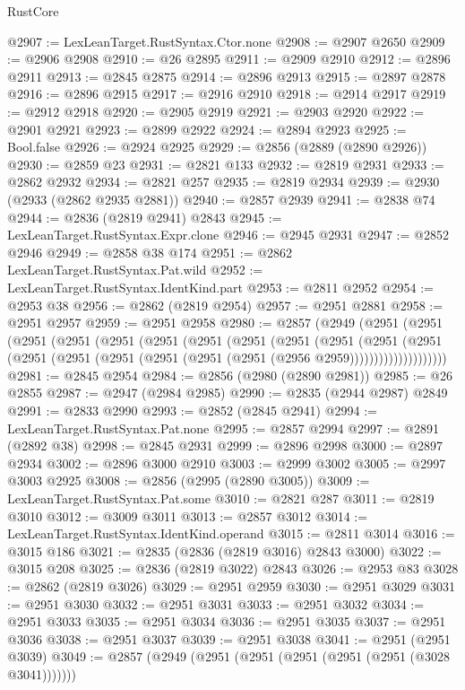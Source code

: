 \begin{lexlean}{RustCore}
\begin{coremodule}
@2907 := LexLeanTarget.RustSyntax.Ctor.none
@2908 := @2907 @2650
@2909 := @2906 @2908
@2910 := @26 @2895
@2911 := @2909 @2910
@2912 := @2896 @2911
@2913 := @2845 @2875
@2914 := @2896 @2913
@2915 := @2897 @2878
@2916 := @2896 @2915
@2917 := @2916 @2910
@2918 := @2914 @2917
@2919 := @2912 @2918
@2920 := @2905 @2919
@2921 := @2903 @2920
@2922 := @2901 @2921
@2923 := @2899 @2922
@2924 := @2894 @2923
@2925 := Bool.false
@2926 := @2924 @2925
@2929 := @2856 (@2889 (@2890 @2926))
@2930 := @2859 @23
@2931 := @2821 @133
@2932 := @2819 @2931
@2933 := @2862 @2932
@2934 := @2821 @257
@2935 := @2819 @2934
@2939 := @2930 (@2933 (@2862 @2935 @2881))
@2940 := @2857 @2939
@2941 := @2838 @74
@2944 := @2836 (@2819 @2941) @2843
@2945 := LexLeanTarget.RustSyntax.Expr.clone
@2946 := @2945 @2931
@2947 := @2852 @2946
@2949 := @2858 @38 @174
@2951 := @2862 LexLeanTarget.RustSyntax.Pat.wild
@2952 := LexLeanTarget.RustSyntax.IdentKind.part
@2953 := @2811 @2952
@2954 := @2953 @38
@2956 := @2862 (@2819 @2954)
@2957 := @2951 @2881
@2958 := @2951 @2957
@2959 := @2951 @2958
@2980 := @2857
    (@2949
      (@2951
        (@2951
          (@2951
            (@2951
              (@2951
                (@2951
                  (@2951
                    (@2951
                      (@2951
                        (@2951
                          (@2951
                            (@2951
                              (@2951
                                (@2951 (@2951 (@2951 (@2951 (@2951 (@2956 @2959))))))))))))))))))))
@2981 := @2845 @2954
@2984 := @2856 (@2980 (@2890 @2981))
@2985 := @26 @2855
@2987 := @2947 (@2984 @2985)
@2990 := @2835 (@2944 @2987) @2849
@2991 := @2833 @2990
@2993 := @2852 (@2845 @2941)
@2994 := LexLeanTarget.RustSyntax.Pat.none
@2995 := @2857 @2994
@2997 := @2891 (@2892 @38)
@2998 := @2845 @2931
@2999 := @2896 @2998
@3000 := @2897 @2934
@3002 := @2896 @3000 @2910
@3003 := @2999 @3002
@3005 := @2997 @3003 @2925
@3008 := @2856 (@2995 (@2890 @3005))
@3009 := LexLeanTarget.RustSyntax.Pat.some
@3010 := @2821 @287
@3011 := @2819 @3010
@3012 := @3009 @3011
@3013 := @2857 @3012
@3014 := LexLeanTarget.RustSyntax.IdentKind.operand
@3015 := @2811 @3014
@3016 := @3015 @186
@3021 := @2835 (@2836 (@2819 @3016) @2843 @3000)
@3022 := @3015 @208
@3025 := @2836 (@2819 @3022) @2843
@3026 := @2953 @83
@3028 := @2862 (@2819 @3026)
@3029 := @2951 @2959
@3030 := @2951 @3029
@3031 := @2951 @3030
@3032 := @2951 @3031
@3033 := @2951 @3032
@3034 := @2951 @3033
@3035 := @2951 @3034
@3036 := @2951 @3035
@3037 := @2951 @3036
@3038 := @2951 @3037
@3039 := @2951 @3038
@3041 := @2951 (@2951 @3039)
@3049 := @2857 (@2949 (@2951 (@2951 (@2951 (@2951 (@2951 (@3028 @3041)))))))

\end{coremodule}
\end{lexlean}
